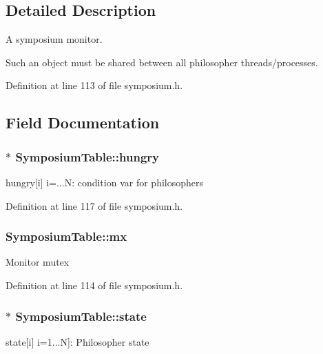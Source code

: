 \subsection{Detailed Description}
A symposium monitor. 

Such an object must be shared between all philosopher threads/processes. 

Definition at line 113 of file symposium.\+h.



\subsection{Field Documentation}
\subsubsection[{\texorpdfstring{hungry}{hungry}}]{$\ast$ Symposium\+Table\+::hungry}\hypertarget{structSymposiumTable_a6daa1fdbfe8e836e72bfd6953bc91f6e}{}\label{structSymposiumTable_a6daa1fdbfe8e836e72bfd6953bc91f6e}
hungry\mbox{[}i\mbox{]} i=...N\+: condition var for philosophers 

Definition at line 117 of file symposium.\+h.

\subsubsection[{\texorpdfstring{mx}{mx}}]{ Symposium\+Table\+::mx}\hypertarget{structSymposiumTable_a8c36f26f523e6b2f99f6e70fff098de8}{}\label{structSymposiumTable_a8c36f26f523e6b2f99f6e70fff098de8}
Monitor mutex 

Definition at line 114 of file symposium.\+h.

\subsubsection[{\texorpdfstring{state}{state}}]{$\ast$ Symposium\+Table\+::state}\hypertarget{structSymposiumTable_a70507f28df670d0db2e59fc65309af08}{}\label{structSymposiumTable_a70507f28df670d0db2e59fc65309af08}
state\mbox{[}i\mbox{]} i=1...N\mbox{]}\+: Philosopher state 

